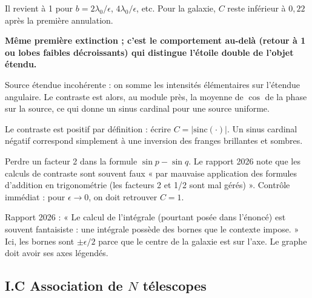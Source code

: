 \documentclass[11pt,a4paper]{article}
\begin{document}
Il revient à 1 pour \(b=2\lambda_0/\epsilon\), \(4\lambda_0/\epsilon\), etc. Pour la galaxie, \(C\) reste inférieur à \(0{,}22\) après la première annulation.

\textbf{Même première extinction ; c'est le comportement au-delà (retour à 1 ou lobes faibles décroissants) qui distingue l'étoile double de l'objet étendu.}

\begin{methode}

Source étendue incohérente : on somme les intensités élémentaires sur l'étendue angulaire. Le contraste est alors, au module près, la moyenne de \(\cos\) de la phase sur la source, ce qui donne un sinus cardinal pour une source uniforme.

\end{methode}

\begin{piege}

Le contraste est positif par définition : écrire \(C=|\mathrm{sinc}(\cdot)|\). Un sinus cardinal négatif correspond simplement à une inversion des franges brillantes et sombres.

\end{piege}

\begin{piege}

Perdre un facteur 2 dans la formule \(\sin p-\sin q\). Le rapport 2026 note que les calculs de contraste sont souvent faux « par mauvaise application des formules d'addition en trigonométrie (les facteurs 2 et 1/2 sont mal gérés) ». Contrôle immédiat : pour \(\epsilon\to0\), on doit retrouver \(C=1\).

\end{piege}

\begin{jury}

Rapport 2026 : « Le calcul de l'intégrale (pourtant posée dans l'énoncé) est souvent fantaisiste : une intégrale possède des bornes que le contexte impose. » Ici, les bornes sont \(\pm\epsilon/2\) parce que le centre de la galaxie est sur l'axe. Le graphe doit avoir ses axes légendés.

\end{jury}

\hypertarget{i.c-association-de-n-tuxe9lescopes}{%
\subsection{\texorpdfstring{I.C Association de \(N\) télescopes}{I.C Association de N télescopes}}\label{i.c-association-de-n-tuxe9lescopes}}
\end{document}
